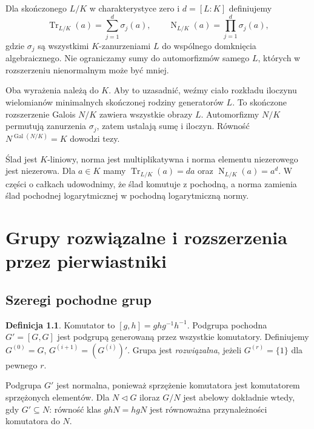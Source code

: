 \documentclass[11pt,a4paper,oneside]{book}
\numberwithin{equation}{section}
\theoremstyle{plain}
\theoremstyle{definition}
\newtheorem{definicja}[twierdzenie]{Definicja}
\theoremstyle{remark}
\newcommand{\Gal}{\operatorname{Gal}}
\newcommand{\Tr}{\operatorname{Tr}}
\newcommand{\Nm}{\operatorname{N}}
\begin{document}
Dla skończonego $L/K$ w charakterystyce zero i $d=[L:K]$ definiujemy
\[
\Tr_{L/K}(a)=\sum_{j=1}^d\sigma_j(a),\qquad
\Nm_{L/K}(a)=\prod_{j=1}^d\sigma_j(a),
\]
gdzie $\sigma_j$ są wszystkimi $K$-zanurzeniami $L$ do wspólnego domknięcia algebraicznego. Nie ograniczamy sumy do automorfizmów samego $L$, których w rozszerzeniu nienormalnym może być mniej.

Oba wyrażenia należą do $K$. Aby to uzasadnić, weźmy ciało rozkładu iloczynu wielomianów minimalnych skończonej rodziny generatorów $L$. To skończone rozszerzenie Galois $N/K$ zawiera wszystkie obrazy $L$. Automorfizmy $N/K$ permutują zanurzenia $\sigma_j$, zatem ustalają sumę i iloczyn. Równość $N^{\Gal(N/K)}=K$ dowodzi tezy.

Ślad jest $K$-liniowy, norma jest multiplikatywna i norma elementu niezerowego jest niezerowa. Dla $a\in K$ mamy $\Tr_{L/K}(a)=da$ oraz $\Nm_{L/K}(a)=a^d$. W części o całkach udowodnimy, że ślad komutuje z pochodną, a norma zamienia ślad pochodnej logarytmicznej w pochodną logarytmiczną normy.


\chapter{Grupy rozwiązalne i rozszerzenia przez pierwiastniki}

\section{Szeregi pochodne grup}

\begin{definicja}
Komutator to $[g,h]=ghg^{-1}h^{-1}$. Podgrupa pochodna $G'=[G,G]$ jest podgrupą generowaną przez wszystkie komutatory. Definiujemy $G^{(0)}=G$, $G^{(i+1)}=(G^{(i)})'$. Grupa jest \emph{rozwiązalna}, jeżeli $G^{(r)}=\{1\}$ dla pewnego $r$.
\end{definicja}

Podgrupa $G'$ jest normalna, ponieważ sprzężenie komutatora jest komutatorem sprzężonych elementów. Dla $N\triangleleft G$ iloraz $G/N$ jest abelowy dokładnie wtedy, gdy $G'\subseteq N$: równość klas $ghN=hgN$ jest równoważna przynależności komutatora do $N$.
\end{document}
